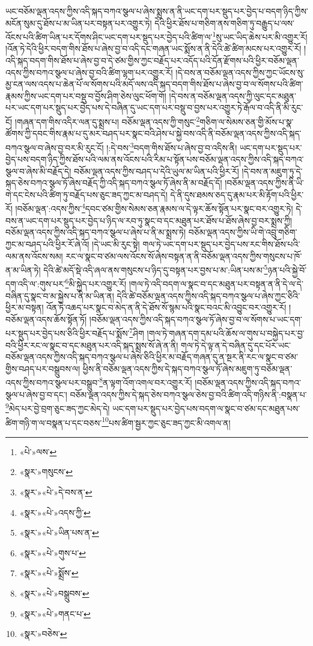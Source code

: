 ཡང་བཅོམ་ལྡན་འདས་ཀྱིས་འདི་སྐད་བཀའ་སྩལ་པ་ཞེས་སྨྲས་ན་ནི་ཡང་དག་པར་སྡུད་པར་བྱེད་པ་བདག་ཉིད་ཀྱིས་མངོན་སུམ་དུ་ཐོས་པ་མ་ཡིན་པར་བསྟན་པར་འགྱུར་ཏེ། དེའི་ཕྱིར་ཐོས་པ་གཅིག་ནས་གཅིག་ཏུ་བརྒྱུད་པ་ལས་འོངས་པའི་ཚིག་ཡིན་པར་དོགས་ཤིང་ཡང་དག་པར་སྡུད་པར་བྱེད་པའི་ཚིག་ལ་\footnote{«པེ་»ལས་}སུ་ཡང་ཡིད་ཆེས་པར་མི་འགྱུར་རོ། །འོན་ཏེ་དེའི་ཕྱིར་བདག་གིས་ཐོས་པ་ཞེས་བྱ་བ་འདི་དང་གཞན་ཡང་སྨོས་ན་ནི་དེའི་ཚེ་ཚིག་མངས་པར་འགྱུར་རོ། །འདི་སྐད་བདག་གིས་ཐོས་པ་ཞེས་བྱ་བ་དེ་ཙམ་གྱིས་ཀྱང་བརྗོད་པར་འདོད་པའི་དོན་རྫོགས་པའི་ཕྱིར་བཅོམ་ལྡན་འདས་ཀྱིས་བཀའ་སྩལ་པ་ཞེས་བྱ་བའི་ཚིག་ལྷག་པར་འགྱུར་རོ། །དེ་བས་ན་བཅོམ་ལྡན་འདས་ཀྱིས་ཀྱང་ཡོངས་སུ་མྱ་ངན་ལས་འདས་པ་ཆེན་པོ་ལ་སོགས་པའི་མདོ་ལས་འདི་སྐད་བདག་གིས་ཐོས་པ་ཞེས་བྱ་བ་ལ་སོགས་པའི་ཚིག་རྣམས་ཀྱིས་ཡང་དག་པར་བསྡུ་བ་བྱོས་ཤིག་ཅེས་ལུང་ཕོག་གོ། །དེ་བས་ན་བཅོམ་ལྡན་འདས་ཀྱི་ལུང་དང་མཐུན་པར་ཡང་དག་པར་སྡུད་པར་བྱེད་པས་དེ་བཞིན་དུ་ཡང་དག་པར་བསྡུ་བ་བྱས་པར་འགྱུར་ཏེ་རྒོལ་བ་འདི་ནི་མི་རུང་ངོ། །གཞན་དག་གིས་འདིར་ལན་དུ་སྨྲས་པ། བཅོམ་ལྡན་འདས་ཀྱི་གསུང་\footnote{«སྣར་»གསུངས་}གཅིག་ལ་སེམས་ཅན་གྱི་མོས་པ་སྣ་ཚོགས་ཀྱི་དབང་གིས་རྣམ་པ་དུ་མར་བཤད་པར་སྣང་བའི་ཤེས་པ་སྐྱེ་བས་འདི་ནི་བཅོམ་ལྡན་འདས་ཀྱིས་འདི་སྐད་བཀའ་སྩལ་བ་ཞེས་བྱ་བར་མི་རུང་ངོ། །:དེ་བས་\footnote{«སྣར་»«པེ་»དེ་བས་ན་}བདག་གིས་ཐོས་པ་ཞེས་བྱ་བ་འདིས་ནི། ཡང་དག་པར་སྡུད་པར་བྱེད་པས་བདག་ཉིད་ཀྱིས་ཐོས་པའི་ལམ་ནས་འོངས་པའི་རིམ་པ་སྟོན་པས་བཅོམ་ལྡན་འདས་ཀྱིས་འདི་སྐད་བཀའ་སྩལ་བ་ཞེས་མི་བརྗོད་དེ། བཅོམ་ལྡན་འདས་ཀྱིས་བཤད་པ་དེའི་ཡུལ་མ་ཡིན་པའི་ཕྱིར་རོ། །དེ་བས་ན་མཇུག་ཏུ་དེ་སྐད་ཅེས་བཀའ་སྩལ་ཏོ་ཞེས་བརྗོད་ཀྱི་འདི་སྐད་བཀའ་སྩལ་ཏོ་ཞེས་ནི་མ་བརྗོད་དོ། །བཅོམ་ལྡན་འདས་ཀྱིས་ནི་ཡི་གེ་དང་ངེས་པའི་ཚིག་ཏུ་བརྗོད་པས་ཅུང་ཟད་ཀྱང་མ་བཤད་དེ། དེ་ནི་དུས་ཐམས་ཅད་དུ་རྣམ་པར་མི་རྟོག་པའི་ཕྱིར་རོ། །བཅོམ་ལྡན་:འདས་ཀྱིས་\footnote{«སྣར་»«པེ་»འདས་ཀྱི་}དབང་ཙམ་གྱིས་སེམས་ཅན་རྣམས་ལ་དེ་ལྟར་ཆོས་སྟོན་པར་སྣང་བར་འགྱུར་ཏེ། དེ་བས་ན་ཡང་དག་པར་སྡུད་པར་བྱེད་པ་ཉིད་ལ་རབ་ཏུ་སྣང་བ་དང་མཐུན་པར་ཐོས་པ་ཐོས་ཞེས་བྱ་བར་སྨྲས་ཀྱི། བཅོམ་ལྡན་འདས་ཀྱིས་འདི་སྐད་བཀའ་སྩལ་པ་ཞེས་པ་ནི་མ་སྨྲས་ཏེ། བཅོམ་ལྡན་འདས་ཀྱིས་ཡི་གེ་འབྲུ་གཅིག་ཀྱང་མ་བཤད་པའི་ཕྱིར་རོ་ཞེ་འོ། །དེ་ཡང་མི་རུང་སྟེ། གལ་ཏེ་ཡང་དག་པར་སྡུད་པར་བྱེད་པས་རང་གིས་ཐོས་པའི་ལམ་ནས་འོངས་སམ། རང་ལ་སྣང་བ་ཙམ་ལས་འོངས་སོ་ཞེས་བསྟན་ན་ནི་བཅོམ་ལྡན་འདས་ཀྱིས་གསུངས་པ་ཁོ་ན་མ་ཡིན་ཏེ། དེའི་ཚེ་མདོ་སྡེ་འདི་ཞལ་ནས་གསུངས་པ་ཉིད་དུ་བསྟན་པར་བྱས་པ་མ་:ཡིན་པས་མ་\footnote{«སྣར་»«པེ་»ཡིན་པས་ན་}ཉན་པའི་སྐྱེ་བོ་དག་འདི་ལ་:གུས་པར་\footnote{«སྣར་»«པེ་»གུས་པ་}མི་སྐྱེད་པར་འགྱུར་རོ། །གལ་ཏེ་འདི་བདག་ལ་སྣང་བ་དང་མཐུན་པར་བསྟན་ན་ནི་དེ་ལ་དེ་བཞིན་དུ་སྣང་བ་མ་སྐྱེས་པ་ནི་མ་ཡིན་ན། དེའི་ཚེ་བཅོམ་ལྡན་འདས་ཀྱིས་འདི་སྐད་བཀའ་སྩལ་པ་ཞེས་ཀྱང་ཅིའི་ཕྱིར་མ་བསྟན། འོན་ཏེ་འཆད་པར་སྣང་བ་མེད་ན་ནི་དེ་ཐོས་སོ་སྙམ་པའི་སྣང་བའང་མི་འབྱུང་བར་འགྱུར་རོ། །བཅོམ་ལྡན་འདས་ཆོས་སྟོན་ཏོ། །བཅོམ་ལྡན་འདས་ཀྱིས་འདི་སྐད་བཀའ་སྩལ་ཏོ་ཞེས་བྱ་བ་ལ་སོགས་པ་ཡང་དག་པར་སྡུད་པར་བྱེད་པས་ཅིའི་ཕྱིར་བརྗོད་པ་སྨོས་\footnote{«སྣར་»«པེ་»སྨྲོས་}ཤིག །གལ་ཏེ་གཞན་དག་དམ་པའི་ཆོས་ལ་གུས་པ་བསྐྱེད་པར་བྱ་བའི་ཕྱིར་རང་ལ་སྣང་བ་དང་མཐུན་པར་འདི་སྐད་སྨྲས་སོ་ཞེ་ན་ནི། གལ་ཏེ་དེ་ལྟ་ན་དེ་བཞིན་དུ་དང་པོར་ཡང་བཅོམ་ལྡན་འདས་ཀྱིས་འདི་སྐད་བཀའ་སྩལ་པ་ཞེས་ཅིའི་ཕྱིར་མ་བརྗོད་གཞན་དུ་ན་སྔར་ནི་རང་ལ་སྣང་བ་ཙམ་གྱིས་བཤད་པར་བསྒྲུབས་ལ། ཕྱིས་ནི་བཅོམ་ལྡན་འདས་ཀྱིས་དེ་སྐད་བཀའ་སྩལ་ཏོ་ཞེས་མཇུག་ཏུ་བཅོམ་ལྡན་འདས་ཀྱིས་བཀའ་སྩལ་པར་བསྒྲུབ་\footnote{«སྣར་»«པེ་»བསྒྲུབས་}ན་ལྟག་འོག་འགལ་བར་འགྱུར་རོ། །བཅོམ་ལྡན་འདས་ཀྱིས་འདི་སྐད་བཀའ་སྩལ་པ་ཞེས་བྱ་བ་དང་། བཅོམ་ལྡན་འདས་ཀྱིས་དེ་སྐད་ཅེས་བཀའ་སྩལ་ཅེས་བྱ་བའི་ཚིག་འདི་གཉིས་ནི་:བསྣན་པ་\footnote{«སྣར་»«པེ་»གནང་པ་}མེད་པར་བྱེ་བྲག་ཅུང་ཟད་ཀྱང་མེད་དེ། ཡང་དག་པར་སྡུད་པར་བྱེད་པས་བདག་ལ་སྣང་བ་ཙམ་དང་མཐུན་པས་ཚིག་གཉི་ག་ལ་བསྣན་པ་དང་བཅས་\footnote{«སྣར་»བཅེས་}པས་ཚིག་སྦྱར་ཀྱང་ཅུང་ཟད་ཀྱང་མི་འགལ་ན། 
